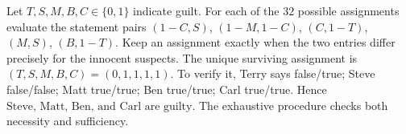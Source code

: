 Let $T,S,M,B,C\in\{0,1\}$ indicate guilt. For each of the $32$ possible assignments evaluate the statement pairs $(1-C,S)$, $(1-M,1-C)$, $(C,1-T)$, $(M,S)$, $(B,1-T)$. Keep an assignment exactly when the two entries differ precisely for the innocent suspects. The unique surviving assignment is $(T,S,M,B,C)=(0,1,1,1,1)$. To verify it, Terry says false/true; Steve false/false; Matt true/true; Ben true/true; Carl true/true. Hence $\boxed{\text{Steve, Matt, Ben, and Carl are guilty}}$. The exhaustive procedure checks both necessity and sufficiency.
